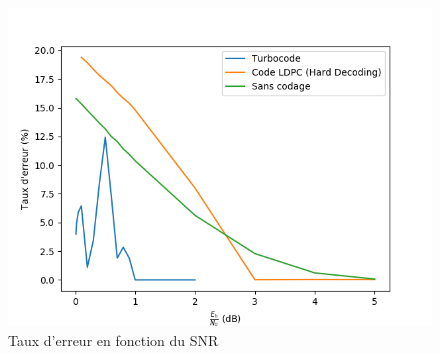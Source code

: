 \documentclass[12pt]{article}
\begin{document}
\begin{figure}
	\centering
	\includegraphics[scale=0.6]{taux_erreur}
	\caption{Taux d'erreur en fonction du SNR}
	\label{fig:taux}
\end{figure}
\end{document}
